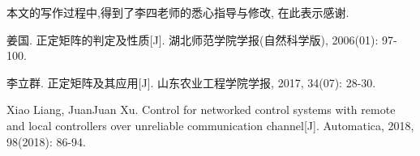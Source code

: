 \documentclass[UTF8,oneside,12pt]{article}  %
\newcommand{\xiaosihao}{\fontsize{12pt}{\baselineskip}\selectfont}
\newcommand{\wuhao}{\fontsize{10.5pt}{\baselineskip}\selectfont}
\theoremstyle{DingLi1}
\numberwithin{equation}{section}
\theoremstyle{DingLi2}
\begin{document}
本文的写作过程中,得到了李四老师的悉心指导与修改, 在此表示感谢.

\renewcommand\refname{\heiti \xiaosihao 参考文献}
\begin{thebibliography}{100}
\wuhao
{}
姜国. 正定矩阵的判定及性质[J]. 湖北师范学院学报(自然科学版), 2006(01): 97-100.

李立群. 正定矩阵及其应用[J]. 山东农业工程学院学报, 2017, 34(07): 28-30.

Xiao Liang, JuanJuan Xu. Control for networked control systems with remote and local controllers over unreliable communication channel[J]. Automatica, 2018, 98(2018): 86-94.


\end{thebibliography}
\end{document}
